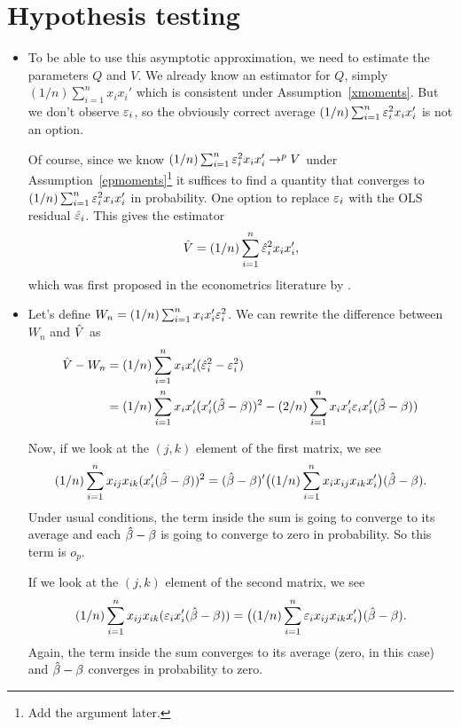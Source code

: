 \section{Hypothesis testing}

\begin{itemize}[leftmargin=0pt]

\item To be able to use this asymptotic approximation, we need to
  estimate the parameters $Q$ and $V$.  We already know an estimator
  for $Q$, simply $(1/n) \sum_{i=1}^n x_i x_i'$ which is consistent under
  Assumption~\ref{xmoments}.  But we don't observe $\varepsilon_i$, so the
  obviously correct average $(1/n) \sum_{i=1}^n \varepsilon_i^2 x_i x_i'$ is not
  an option.

  Of course, since we know $(1/n) \sum_{i=1}^n \varepsilon_i^2 x_i x_i' \to^p V$
  under Assumption~\ref{epmoments}\footnote{Add the argument later.}
  it suffices to find a quantity that converges to $(1/n) \sum_{i=1}^n
  \varepsilon_i^2 x_i x_i'$ in probability.  One option to replace $\varepsilon_i$ with
  the OLS residual $\hat{\varepsilon}_i$.  This gives the estimator
  \begin{equation*}
    \hat{V} = (1/n) \sum_{i=1}^n \hat{\varepsilon}_i^2 x_i x_i',
  \end{equation*}
  which was first proposed in the econometrics literature by
  \citet{Whi80}.

\item Let's define $W_n = (1/n) \sum_{i=1}^n x_i x_i' \varepsilon_i^2$.  We can
  rewrite the difference between $W_n$ and $\hat{V}$ as
  \begin{align*}
    \hat{V} - W_n
    &= (1/n) \sum_{i=1}^n x_i x_i' (\hat{\varepsilon}^2_i - \varepsilon_i^2) \\
    &= (1/n) \sum_{i=1}^n x_i x_i' (x_i'(\hat{\beta} - \beta))^2
    - (2/n) \sum_{i=1}^n  x_i x_i' \varepsilon_i x_i'(\hat{\beta} - \beta))
  \end{align*}

  Now, if we look at the $(j,k)$ element of the first matrix, we see
  \begin{equation*}
    (1/n) \sum_{i=1}^n x_{ij} x_{ik}(x_i'(\hat{\beta} - \beta))^2 =
    (\hat{\beta} - \beta)' \big((1/n) \sum_{i=1}^n x_i x_{ij} x_{ik} x_{i}'\big) (\hat{\beta}- \beta).
  \end{equation*}
  Under usual conditions, the term inside the sum is going to converge
  to its average and each $\hat{\beta} - \beta$ is going to converge to zero in
  probability.  So this term is $o_p$.

  If we look at the $(j,k)$ element of the second matrix, we see
  \begin{equation*}
    (1/n) \sum_{i=1}^n x_{ij} x_{ik}(\varepsilon_i x_i'(\hat{\beta} - \beta)) =
    \big((1/n) \sum_{i=1}^n \varepsilon_i x_{ij} x_{ik} x_{i}'\big) (\hat{\beta}- \beta).
  \end{equation*}
  Again, the term inside the sum converges to its average (zero, in
  this case) and $\hat{\beta} - \beta$ converges in probability to zero.


\end{itemize}
